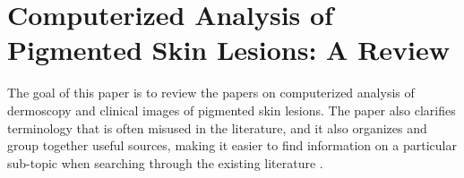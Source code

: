 \section{Computerized Analysis of Pigmented Skin Lesions: A
Review}

The goal of this paper is to review the papers on computerized analysis of
dermoscopy and clinical images of pigmented skin lesions. The paper also
clarifies terminology that is often misused in the literature, and it also
organizes and group together useful sources, making it easier to find
information on a particular sub-topic when searching through the existing
literature \cite{MelanomaTopicsReview}.
